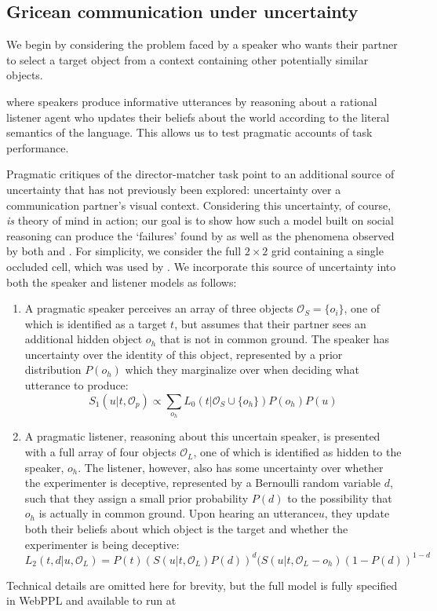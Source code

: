 \documentclass[manuscript]{stjour}
\begin{document}
\subsection{Gricean communication under uncertainty}

We begin by considering the problem faced by a speaker who wants their partner to select a target object from a context containing other potentially similar objects. %

where speakers produce informative utterances by reasoning about a rational listener agent who updates their beliefs about the world according to the literal semantics of the language. This allows us to test pragmatic accounts of task performance. 

Pragmatic critiques of the director-matcher task point to an additional source of uncertainty that has not previously been explored: uncertainty over a communication partner's visual context. Considering this uncertainty, of course, \emph{is} theory of mind in action; our goal is to show how such a model built on social reasoning can produce the `failures' found by \cite{KeysarLinBarr03_LimitsOnTheoryOfMindUse} as well as the phenomena observed by both \cite{HawkinsGoodman16_Keysar} and \cite{RubioFernandez16_DirectorTaskAttention}. For simplicity, we consider the full $2\times 2$ grid containing a single occluded cell, which was used by \cite{RubioFernandez16_DirectorTaskAttention}. We incorporate this source of uncertainty into both the speaker and listener models as follows:

\begin{enumerate}
\item A pragmatic speaker perceives an array of three objects $\mathcal{O}_S = \{o_i\}$, one of which is identified as a target $t$, but assumes that their partner sees an additional hidden object $o_h$ that is not in common ground. The speaker has uncertainty over the identity of this object, represented by a prior distribution $P(o_h)$ which they marginalize over when deciding what utterance to produce:
$$S_1(u | t, \mathcal{O}_p) \propto \sum_{o_h} L_0(t| \mathcal{O}_S \cup \{o_h\})P(o_h)P(u)$$

\item A pragmatic listener, reasoning about this uncertain speaker, is presented with a full array of four objects $\mathcal{O}_L$, one of which is identified as hidden to the speaker, $o_h$. The listener, however, also has some uncertainty over whether the experimenter is deceptive, represented by a Bernoulli random variable $d$, such that they assign a small prior probability $P(d)$ to the possibility that $o_h$ is actually in common ground. Upon hearing an utterance$u$, they update both their beliefs about which object is the target and whether the experimenter is being deceptive:
$$L_2(t, d | u, \mathcal{O}_L) = P(t)\left(S(u | t, \mathcal{O}_L)P(d)\right)^d(S(u | t, \mathcal{O}_L - o_h)(1-P(d))^{1-d}$$
\end{enumerate}
Technical details are omitted here for brevity, but the full model is fully specified in WebPPL and available to run at %
\end{document}
